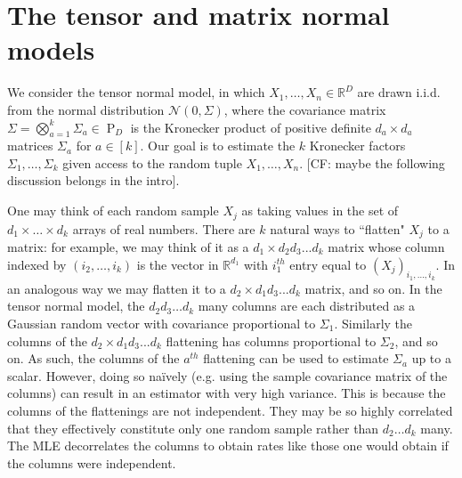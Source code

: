 \documentclass{article}
\newcommand{\R}{{\mathbb{R}}}
\newcommand\cN{\mathcal{N}}
\newcommand\PD{\operatorname{P}}
\newcommand{\CF}[1]{{\color{purple}[CF: #1]}}
\begin{document}

\section{The tensor and matrix normal models}


We consider the tensor normal model, in which $X_1, \dots, X_n \in \R^D$ are drawn i.i.d. from the normal distribution $\cN(0, \Sigma)$, where the covariance matrix $\Sigma = \bigotimes_{a = 1}^{k} \Sigma_a \in \PD_D$ is the Kronecker product of positive definite $d_a\times d_a$ matrices $\Sigma_a$ for $a\in [k]$. Our goal is to estimate the $k$ Kronecker factors $\Sigma_1, \dots, \Sigma_k$ given access to the random tuple $X_1, \dots, X_n$. \CF{maybe the following discussion belongs in the intro}. 

One may think of each random sample $X_j$ as taking values in the set of $d_1 \times \dots \times d_k$ arrays of real numbers. There are $k$ natural ways to ``flatten" $X_j$ to a matrix: for example, we may think of it as a $d_1 \times d_2d_3...d_k$ matrix whose column indexed by $(i_2,\dots, i_k)$ is the vector in $\R^{d_1}$ with $i_1^{th}$ entry equal to $(X_j)_{i_1, \dots, i_k}$. In an analogous way we may flatten it to a $d_2 \times d_1d_3...d_k$ matrix, and so on. In the tensor normal model, the $d_2d_3\dots d_k$ many columns are each distributed as a Gaussian random vector with covariance proportional to $\Sigma_1$. Similarly the columns of the $d_2 \times d_1d_3...d_k$ flattening has columns proportional to $\Sigma_2$, and so on. As such, the columns of the $a^{th}$ flattening can be used to estimate $\Sigma_a$ up to a scalar. However, doing so na\"ively (e.g. using the sample covariance matrix of the columns) can result in an estimator with very high variance. This is because the columns of the flattenings are not independent. They may be so highly correlated that they effectively constitute only one random sample rather than $d_2\dots d_k$ many. The MLE decorrelates the columns to obtain rates like those one would obtain if the columns were independent.
\end{document}
